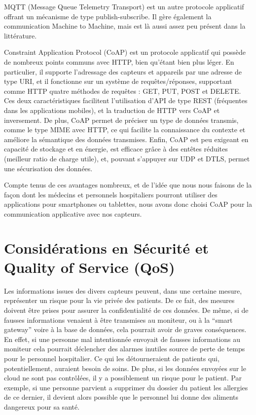 \documentclass{article}
\begin{document}
MQTT (Message Queue Telemetry Transport) est un autre protocole applicatif offrant un mécanisme de type publish-subscribe. Il gère également la communication Machine to Machine, mais est là aussi assez peu présent dans la littérature.

Constraint Application Protocol (CoAP) est un protocole applicatif qui possède de nombreux points communs avec HTTP, bien qu’étant bien plus léger. En particulier, il supporte l’adressage des capteurs et appareils par une adresse de type URI, et il fonctionne sur un système de requêtes/réponses, supportant comme HTTP quatre méthodes de requêtes : GET, PUT, POST et DELETE. Ces deux caractéristiques facilitent l’utilisation d’API de type REST (fréquentes dans les applications mobiles), et la traduction de HTTP vers CoAP et inversement. De plus, CoAP permet de préciser un type de données transmis, comme le type MIME avec HTTP, ce qui facilite la connaissance du contexte et améliore la sémantique des données transmises. Enfin, CoAP est peu exigeant en capacité de stockage et en énergie, est efficace grâce à des entêtes réduites (meilleur ratio de charge utile), et, pouvant s’appuyer sur UDP et DTLS, permet une sécurisation des données.

Compte tenus de ces avantages nombreux, et de l’idée que nous nous faisons de la façon dont les médecins et personnels hospitaliers pourront utiliser des applications pour smartphones ou tablettes, nous avons donc choisi CoAP pour la communication applicative avec nos capteurs.

\section {Considérations en Sécurité et Quality of Service (QoS)}

Les informations issues des divers capteurs peuvent, dans une certaine mesure, représenter un risque pour la vie privée des patients. De ce fait, des mesures doivent être prises pour assurer la confidentialité de ces données. De même, si de fausses informations venaient à être transmises au moniteur, ou à la “smart gateway” voire à la base de données, cela pourrait avoir de graves conséquences. En effet, si une personne mal intentionnée envoyait de fausses informations au moniteur cela pourrait déclencher des alarmes inutiles source de perte de temps pour le personnel hospitalier. Ce qui les détourneraient de patients qui, potentiellement, auraient besoin de soins. De plus, si les données envoyées sur le cloud ne sont pas contrôlées, il y a possiblement un risque pour le patient. Par exemple, si une personne parvient a supprimer du dossier du patient les allergies de ce dernier, il devient alors possible que le personnel lui donne des aliments dangereux pour sa santé.
\end{document}

